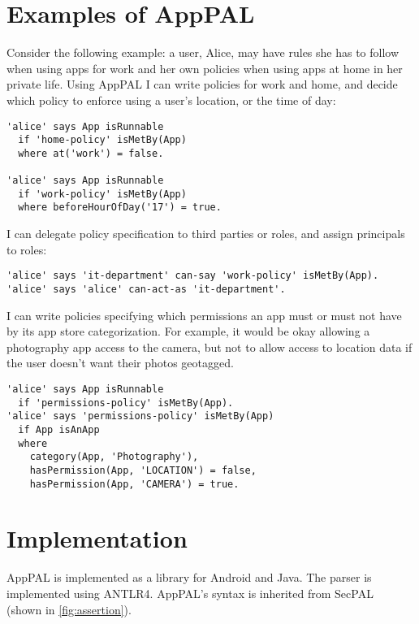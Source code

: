 \documentclass[thesis.tex]{subfiles}
\begin{document}
\section{Examples of AppPAL}

Consider the following example: a user, Alice, may have rules she has to follow
when using apps for work and her own policies when using apps at home in her
private life. Using AppPAL I can write policies for work and home, and decide
which policy to enforce using a user's location, or the time of day:

\begin{lstlisting}
'alice' says App isRunnable
  if 'home-policy' isMetBy(App)
  where at('work') = false.

'alice' says App isRunnable
  if 'work-policy' isMetBy(App)
  where beforeHourOfDay('17') = true.
\end{lstlisting}

I can delegate policy specification to third parties or roles, and assign principals to roles:

\begin{lstlisting}
'alice' says 'it-department' can-say 'work-policy' isMetBy(App).
'alice' says 'alice' can-act-as 'it-department'.
\end{lstlisting}

I can write policies specifying which permissions an app must or must not have
by its app store categorization. For example, it would be okay allowing a
photography app access to the camera, but not to allow access to location data
if the user doesn't want their photos geotagged.

\begin{lstlisting}
'alice' says App isRunnable
  if 'permissions-policy' isMetBy(App).
'alice' says 'permissions-policy' isMetBy(App)
  if App isAnApp
  where
    category(App, 'Photography'),
    hasPermission(App, 'LOCATION') = false,
    hasPermission(App, 'CAMERA') = true.
\end{lstlisting}

\section{Implementation}

AppPAL is implemented as a library for Android and Java.
The parser is implemented using ANTLR4.
AppPAL's syntax is inherited from SecPAL~\cite{becker_secpal:_2010} (shown in \autoref{fig:assertion}).
\end{document}
